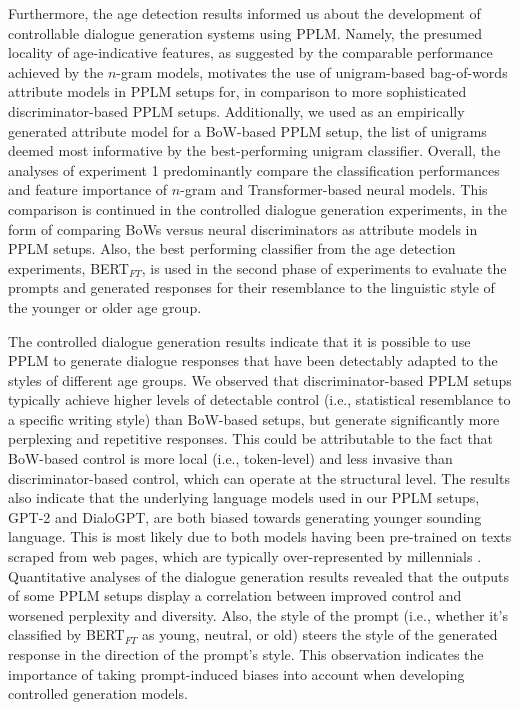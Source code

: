 Furthermore, the age detection results informed us about the development of controllable dialogue generation systems using PPLM. Namely, the presumed locality of age-indicative features, as suggested by the comparable performance achieved by the $n$-gram models, motivates the use of unigram-based bag-of-words attribute models in PPLM setups for, in comparison to more sophisticated discriminator-based PPLM setups. Additionally, we used as an empirically generated attribute model for a BoW-based PPLM setup, the list of unigrams deemed most informative by the best-performing unigram classifier. Overall, the analyses of experiment 1 predominantly compare the classification performances and feature importance of $n$-gram and Transformer-based neural models. This comparison is continued in the controlled dialogue generation experiments, in the form of comparing BoWs versus neural discriminators as attribute models in PPLM setups. Also, the best performing classifier from the age detection experiments, BERT$_{FT}$, is used in the second phase of experiments to evaluate the prompts and generated responses for their resemblance to the linguistic style of the younger or older age group.

The controlled dialogue generation results indicate that it is possible to use PPLM to generate dialogue responses that have been detectably adapted to the styles of different age groups. We observed that discriminator-based PPLM setups typically achieve higher levels of detectable control (i.e., statistical resemblance to a specific writing style) than BoW-based setups, but generate significantly more perplexing and repetitive responses. This could be attributable to the fact that BoW-based control is more local (i.e., token-level) and less invasive than discriminator-based control, which can operate at the structural level. The results also indicate that the underlying language models used in our PPLM setups, GPT-2 and DialoGPT, are both biased towards generating younger sounding language. This is most likely due to both models having been pre-trained on texts scraped from web pages, which are typically over-represented by millennials \citep{radford2019language, zhang2019dialogpt}. 
Quantitative analyses of the dialogue generation results revealed that the outputs of some PPLM setups display a correlation between improved control and worsened perplexity and diversity. Also, the style of the prompt (i.e., whether it's classified by BERT$_{FT}$ as young, neutral, or old) steers the style of the generated response in the direction of the prompt's style. This observation indicates the importance of taking prompt-induced biases into account when developing controlled generation models.

